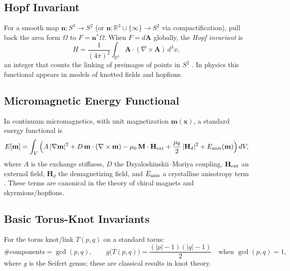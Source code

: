 \documentclass[11pt, a4paper]{article}
\begin{document}
\subsection{Hopf Invariant}
For a smooth map \(\mathbf n: S^3\to S^2\) (or \(\mathbf n:\mathbb{R}^3\cup\{\infty\}\to S^2\) via compactification), pull back the area form \(\Omega\) to \(F=\mathbf n^*\Omega\). When \(F=d\mathbf A\) globally, the \emph{Hopf invariant} is
\begin{equation}
    H = \frac{1}{(4\pi)^2}\int_{\mathbb{R}^3} \mathbf A\cdot(\nabla\times \mathbf A)\, d^3x,
    \label{eq:HopfInvariant}
\end{equation}
an integer that counts the linking of preimages of points in \(S^2\) \cite{Hopf1931,Whitehead1947}. In physics this functional appears in models of knotted fields and hopfions.

\subsection{Micromagnetic Energy Functional}
In continuum micromagnetics, with unit magnetization \(\mathbf m(\mathbf x)\), a standard energy functional is
\begin{equation}
    E[\mathbf m] = \int_V \Big(
    A\,\lvert\nabla \mathbf m\rvert^2
    + D\, \mathbf m\cdot(\nabla\times \mathbf m)
    - \mu_0\,\mathbf M\cdot \mathbf H_{\rm ext}
    + \frac{\mu_0}{2}\,\lvert \mathbf H_d\rvert^2
    + E_{\rm anis}(\mathbf m)
    \Big)\, dV,
    \label{eq:micromagnetics}
\end{equation}
where \(A\) is the exchange stiffness, \(D\) the Dzyaloshinskii--Moriya coupling, \(\mathbf H_{\rm ext}\) an external field, \(\mathbf H_d\) the demagnetizing field, and \(E_{\rm anis}\) a crystalline anisotropy term \cite{Dzyaloshinskii1958,Moriya1960,Aharoni1996}. These terms are canonical in the theory of chiral magnets and skyrmions/hopfions.

\subsection{Basic Torus-Knot Invariants}
For the torus knot/link \(T(p,q)\) on a standard torus:
\begin{equation}
    \#\text{components} = \gcd(p,q), \qquad
    g\big(T(p,q)\big) = \frac{(|p|-1)(|q|-1)}{2}\quad\text{when }\gcd(p,q)=1,
    \label{eq:torusInvariants}
\end{equation}
where \(g\) is the Seifert genus; these are classical results in knot theory.
\end{document}
